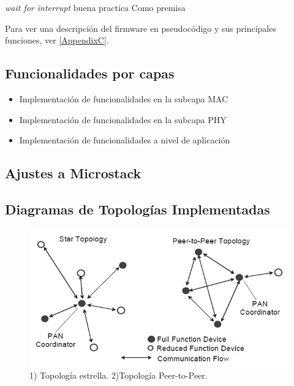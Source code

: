 \textit{wait for interrupt} buena practica
Como premisa

Para ver una descripción del firmware en pseudocódigo y sus principales funciones, ver \ref{AppendixC}.

\subsection{Funcionalidades por capas}
\label{subsec:func} 
\begin{itemize}
	\item Implementación de funcionalidades en la subcapa MAC

	\item Implementación de funcionalidades en la subcapa PHY

	\item Implementación de funcionalidades a nivel de aplicación
	
\end{itemize}

\subsection{Ajustes a Microstack}
\label{subsec:stack} 

\subsection{Diagramas de Topologías Implementadas}
\label{subsec:topo} 

\begin{figure}[h!]
	\centering
    \includegraphics[width=.8\textwidth]{./Figures/topologia.jpg}
    	\caption{1) Topología estrella. 2)Topología Peer-to-Peer.}
	\label{fig:topo}
\end{figure}

